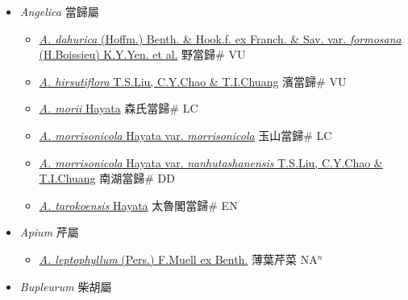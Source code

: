 
  \begin{itemize}
 \item[] \textit{Angelica} 當歸屬
                    
  \begin{itemize}
        \item[] \href{http://www.theplantlist.org/tpl1.1/search?q=Angelica+dahurica+var.+formosana}{\textit{A. dahurica} (Hoffm.) Benth. \& Hook.f. ex Franch. \& Sav. var. \textit{formosana} (H.Boissieu) K.Y.Yen. et al.}   野當歸\# VU
        \item[] \href{http://www.theplantlist.org/tpl1.1/search?q=Angelica+hirsutiflora}{\textit{A. hirsutiflora} T.S.Liu, C.Y.Chao \& T.I.Chuang}   濱當歸\# VU
        \item[] \href{http://www.theplantlist.org/tpl1.1/search?q=Angelica+morii}{\textit{A. morii} Hayata}   森氏當歸\# LC
        \item[] \href{http://www.theplantlist.org/tpl1.1/search?q=Angelica+morrisonicola+var.+morrisonicola}{\textit{A. morrisonicola} Hayata var. \textit{morrisonicola}}   玉山當歸\# LC
        \item[] \href{http://www.theplantlist.org/tpl1.1/search?q=Angelica+morrisonicola+var.+nanhutashanensis}{\textit{A. morrisonicola} Hayata var. \textit{nanhutashanensis} T.S.Liu, C.Y.Chao \& T.I.Chuang}   南湖當歸\# DD
        \item[] \href{http://www.theplantlist.org/tpl1.1/search?q=Angelica+tarokoensis}{\textit{A. tarokoensis} Hayata}   太魯閣當歸\# EN
  \end{itemize}
 \item[] \textit{Apium} 芹屬
                    
  \begin{itemize}
        \item[] \href{http://www.theplantlist.org/tpl1.1/search?q=Apium+leptophyllum}{\textit{A. leptophyllum} (Pers.) F.Muell ex Benth.}   薄葉芹菜 NA$^n$
  \end{itemize}
 \item[] \textit{Bupleurum} 柴胡屬
                    

\end{itemize}
